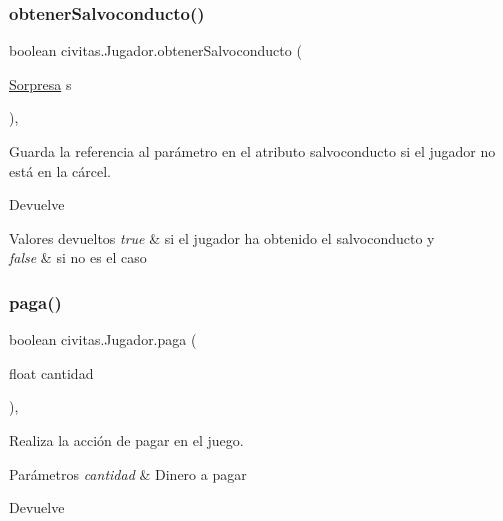 \subsubsection{\texorpdfstring{obtener\+Salvoconducto()}{obtenerSalvoconducto()}}
{\footnotesize\ttfamily boolean civitas.\+Jugador.\+obtener\+Salvoconducto (\begin{DoxyParamCaption}\item[{\hyperlink{classcivitas_1_1Sorpresa}{Sorpresa}}]{s }\end{DoxyParamCaption})\hspace{0.3cm}{\ttfamily [inline]}, {\ttfamily [package]}}

Guarda la referencia al parámetro en el atributo salvoconducto si el jugador no está en la cárcel. \begin{DoxyReturn}{Devuelve}

\end{DoxyReturn}

\begin{DoxyRetVals}{Valores devueltos}
{\em true} & si el jugador ha obtenido el salvoconducto y \\
\hline
{\em false} & si no es el caso \\
\hline
\end{DoxyRetVals}
\mbox{\label{classcivitas_1_1Jugador_a5a7a0ba48bd151a808fa2f3edeecf75f}} 
\subsubsection{\texorpdfstring{paga()}{paga()}}
{\footnotesize\ttfamily boolean civitas.\+Jugador.\+paga (\begin{DoxyParamCaption}\item[{float}]{cantidad }\end{DoxyParamCaption})\hspace{0.3cm}{\ttfamily [inline]}, {\ttfamily [package]}}

Realiza la acción de pagar en el juego. 
\begin{DoxyParams}{Parámetros}
{\em cantidad} & Dinero a pagar \\
\hline
\end{DoxyParams}
\begin{DoxyReturn}{Devuelve}

\end{DoxyReturn}

